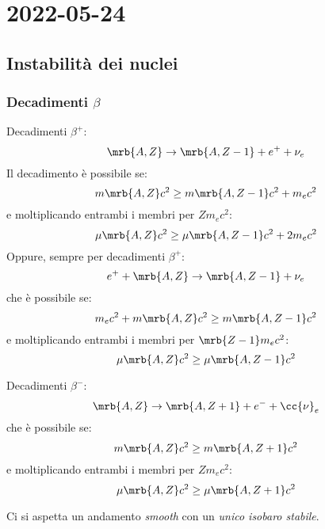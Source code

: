 \chapter{2022-05-24}
\section{Instabilità dei nuclei}
\subsection{Decadimenti $\beta$}
Decadimenti $\beta^+$:
\[
  \mrb{A, Z} \rightarrow \mrb{A, Z - 1} + e^+ + \nu_e
\]
Il decadimento è possibile se:
\[
  m \mrb{A, Z} c^2 \geq m \mrb{A, Z - 1} c^2 + m_e c^2
\]
e moltiplicando entrambi i membri per $Z m_e c^2$: %
\[
  \mu \mrb{A, Z} c^2 \geq \mu \mrb{A, Z - 1} c^2 + 2 m_e c^2
\]
Oppure, sempre per decadimenti $\beta^+$:
\[
  e^+ + \mrb{A, Z} \rightarrow \mrb{A, Z - 1} + \nu_e
\]
che è possibile se:
\[
  m_e c^2 + m \mrb{A, Z} c^2 \geq m \mrb{A, Z - 1} c^2
\]
e moltiplicando entrambi i membri per $\mrb{Z - 1} m_e c^2$: %
\[
  \mu \mrb{A, Z} c^2 \geq \mu \mrb{A, Z - 1} c^2
\]

Decadimenti $\beta^-$:
\[
  \mrb{A, Z} \rightarrow \mrb{A, Z + 1} + e^- + \cc{\nu}_e
\]
che è possibile se:
\[
  m \mrb{A, Z} c^2 \geq m \mrb{A, Z + 1} c^2
\]
e moltiplicando entrambi i membri per $Z m_e c^2$: %
\[
  \mu \mrb{A, Z} c^2 \geq \mu \mrb{A, Z + 1} c^2
\]

\begin{note}[]
  Ci si aspetta un andamento \textit{smooth} con un \textit{unico isobaro
  stabile}.
\end{note}

